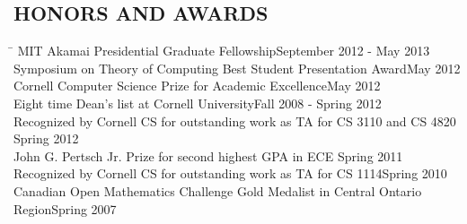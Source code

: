 \documentclass{res}
\begin{document}
\begin{resume}
\section{HONORS AND AWARDS}
    \vspace{-0.1in}
    \begin{tabbing}
    \hspace{5.10in}\=\kill
    MIT Akamai Presidential Graduate Fellowship\>September 2012 - May 2013 \\
    Symposium on Theory of Computing Best Student Presentation Award\>May 2012 \\
    Cornell Computer Science Prize for Academic Excellence\>May 2012 \\
    Eight time Dean's list at Cornell University\>Fall 2008 - Spring 2012 \\
    Recognized by Cornell CS for outstanding work as TA for CS 3110 and CS 4820 \>Spring 2012 \\
    John G. Pertsch Jr. Prize for second highest GPA in ECE \> Spring 2011 \\
    Recognized by Cornell CS for outstanding work as TA for CS 1114\>Spring 2010 \\
    Canadian Open Mathematics Challenge Gold Medalist in Central Ontario Region\>Spring 2007
    \end{tabbing}


\end{resume}
\end{document}
